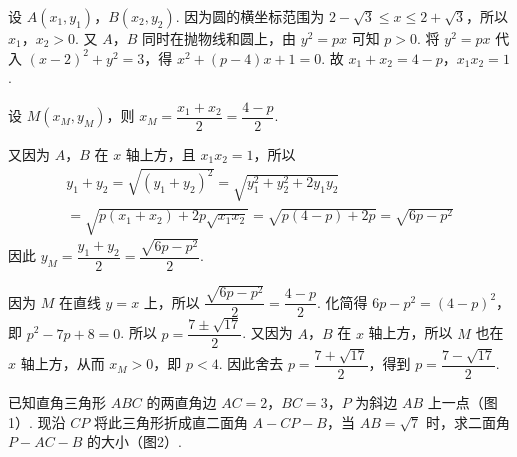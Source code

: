 \documentclass[UTF8,a4paper,oneside,11pt]{ctexbook}
\begin{document}
\begin{solution}
设 \(A(x_1,y_1)\)，\(B(x_2,y_2)\). 因为圆的横坐标范围为 \(2-\sqrt{3}\leqslant x\leqslant2+\sqrt{3}\)，所以 \(x_1\)，\(x_2>0\). 又 \(A\)，\(B\) 同时在抛物线和圆上，由 \(y^2=px\) 可知 \(p>0\). 将 \(y^2=px\) 代入 \((x-2)^2+y^2=3\)，得 \(x^2+\left( p-4 \right)x+1=0\).
故 \(x_1+x_2=4-p\)，\(x_1x_2=1\).

设 \(M(x_M,y_M)\)，则 \(x_M=\dfrac{x_1+x_2}{2}=\dfrac{4-p}{2}\).

又因为 \(A\)，\(B\) 在 \(x\) 轴上方，且 \(x_1x_2=1\)，所以
\[
\begin{gathered}
y_1+y_2
 =\sqrt{\left( y_1+y_2 \right)^2}
 =\sqrt{y_1^2+y_2^2+2y_1y_2}\\
 =\sqrt{p(x_1+x_2)+2p\sqrt{x_1x_2}}
 =\sqrt{p(4-p)+2p}=\sqrt{6p-p^2}
\end{gathered}
\]
因此 \(y_M=\dfrac{y_1+y_2}{2}=\dfrac{\sqrt{6p-p^2}}{2}\).

因为 \(M\) 在直线 \(y=x\) 上，所以 \(\dfrac{\sqrt{6p-p^2}}{2}=\dfrac{4-p}{2}\).
化简得 \(6p-p^2=\left( 4-p \right)^2\)，即 \(p^2-7p+8=0\).
所以 \(p=\dfrac{7\pm \sqrt{17}}{2}\).
又因为 \(A\)，\(B\) 在 \(x\) 轴上方，所以 \(M\) 也在 \(x\) 轴上方，从而 \(x_M>0\)，即 \(p<4\). 因此舍去 \(p=\dfrac{7+\sqrt{17}}{2}\)，得到 \(p=\dfrac{7-\sqrt{17}}{2}\).
\end{solution}

\begin{problem}

已知直角三角形 \(ABC\) 的两直角边 \(AC=2\)，\(BC=3\)，\(P\) 为斜边 \(AB\) 上一点（图1）. 现沿 \(CP\) 将此三角形折成直二面角 \(A-CP-B\)，当 \(AB=\sqrt{7}\) 时，求二面角 \(P-AC-B\) 的大小（图2）.


\end{problem}
\end{document}
